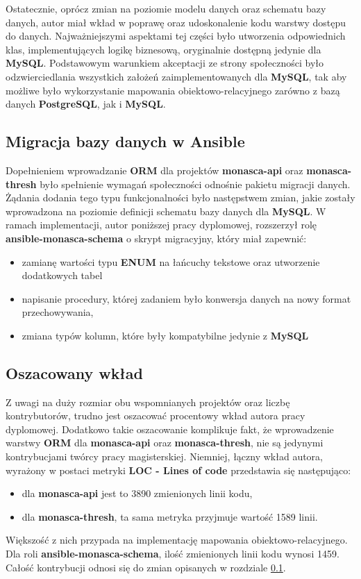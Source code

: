     Ostatecznie, oprócz zmian na poziomie modelu danych oraz schematu bazy danych, autor miał wkład w poprawę oraz udoskonalenie
    kodu warstwy dostępu do danych. Najważniejszymi aspektami tej części było utworzenia odpowiednich klas, implementujących logikę
    biznesową, oryginalnie dostępną jedynie dla \textbf{MySQL}. Podstawowym warunkiem akceptacji ze strony społeczności było
    odzwierciedlania wszystkich założeń zaimplementowanych dla \textbf{MySQL}, tak aby możliwe było wykorzystanie mapowania obiektowo-relacyjnego
    zarówno z bazą danych \textbf{PostgreSQL}, jak i \textbf{MySQL}.
    
    \subsection{Migracja bazy danych w Ansible}
    \label{chapter:application:own_work:orm:ansible_migration}
    Dopełnieniem wprowadzanie \textbf{ORM} dla projektów \textbf{monasca-api} oraz \textbf{monasca-thresh} było spełnienie
    wymagań społeczności odnośnie pakietu migracji danych. Żądania dodania tego typu funkcjonalności było następstwem zmian, jakie
    zostały wprowadzona na poziomie definicji schematu bazy danych dla \textbf{MySQL}. W ramach implementacji, autor poniższej pracy dyplomowej,
    rozszerzył rolę \textbf{ansible-monasca-schema} o skrypt migracyjny, który miał zapewnić:
    \begin{itemize}
        \item zamianę wartości typu \textbf{ENUM} na łańcuchy tekstowe oraz utworzenie dodatkowych tabel
        \item napisanie procedury, której zadaniem było konwersja danych na nowy format przechowywania,
        \item zmiana typów kolumn, które były kompatybilne jedynie z \textbf{MySQL}
    \end{itemize}
    
    \subsection{Oszacowany wkład}
    Z uwagi na duży rozmiar obu wspomnianych projektów oraz liczbę kontrybutorów, trudno jest oszacować procentowy wkład 
    autora pracy dyplomowej. Dodatkowo takie oszacowanie komplikuje fakt, że wprowadzenie warstwy \textbf{ORM} dla 
    \textbf{monasca-api} oraz \textbf{monasca-thresh}, nie są jedynymi kontrybucjami twórcy pracy magisterskiej. Niemniej, 
    łączny wkład autora, wyrażony w postaci metryki \textbf{LOC - Lines of code} przedstawia się następująco:
    \begin{itemize}
        \item dla \textbf{monasca-api} jest to 3890 zmienionych linii kodu,
        \item dla \textbf{monasca-thresh}, ta sama metryka przyjmuje wartość 1589 linii.
    \end{itemize}
    Większość z nich przypada na implementację mapowania obiektowo-relacyjnego.
    Dla roli \textbf{ansible-monasca-schema}, ilość zmienionych linii kodu wynosi 1459. Całość kontrybucji odnosi się do 
    zmian opisanych w rozdziale \ref{chapter:application:own_work:orm:ansible_migration}.

